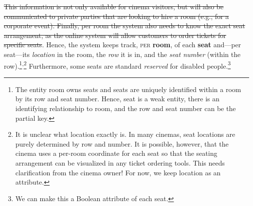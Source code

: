 \documentclass{article}
\newcommand{\ENT}[1]{\textcolor{colA}{\textbf{#1}}}
\newcommand{\AT}[1]{\textcolor{colB}{\textit{#1}}}
\newcommand{\RS}[1]{\textcolor{colC}{\textsc{#1}}}
\newcommand{\IR}[1]{\textcolor{black!50}{\sout{#1}}}
\begin{document}
\IR{This information is not only available for cinema visitors, but will also be communicated to private parties that are looking to hire a room (e.g., for a corporate event). Finally, per room the system also needs to know the exact seat arrangement, as the online system will allow customers to order tickets for specific seats}. Hence, the system keeps track, \RS{per} \ENT{room}, of each \ENT{seat} and---per seat---its \AT{location} in the room, the \AT{row} it is in, and the \AT{seat number} (within the row).\footnote{The entity room owns seats and seats are uniquely identified within a room by its row and seat number. Hence, seat is a weak entity, there is an identifying relationship to room, and the row and seat number can be the partial key. }\textsuperscript{,}\footnote{It is unclear what location exactly is. In many cinemas, seat locations are purely determined by row and number. It is possible, however, that the cinema uses a per-room coordinate for each seat so that the seating arrangement can be visualized in any ticket ordering tools. This needs clarification from the cinema owner! For now, we keep location as an attribute.} Furthermore, some seats are standard \AT{reserved} for disabled people.\footnote{We can make this a Boolean attribute of each seat.}
\end{document}
